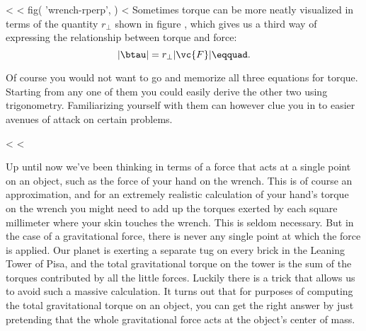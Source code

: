 <%
<%
  fig(
    'wrench-rperp',
  )
<%
Sometimes torque can be more neatly visualized in terms of
the quantity $r_{\perp}$ shown in figure , which
gives us a third way of expressing the relationship
between torque and force:
\begin{equation*}
                |\btau |    =    r_{\perp} |\vc{F}|\eqquad.
\end{equation*}

Of course you would not want to go and memorize all three
equations for torque. Starting from any one of them you
could easily derive the other two using trigonometry.
Familiarizing yourself with them can however clue you in to
easier avenues of attack on certain problems.

<%
<%

Up until now we've been thinking in terms of a force that
acts at a single point on an object, such as the force of
your hand on the wrench. This is of course an approximation,
and for an extremely realistic calculation of your hand's
torque on the wrench you might need to add up the torques
exerted by each square millimeter where your skin touches
the wrench. This is seldom necessary. But in the case of a
gravitational force, there is never any single point at
which the force is applied. Our planet is exerting a
separate tug on every brick in the Leaning Tower of Pisa,
and the total gravitational torque on the tower is the sum
of the torques contributed by all the little forces. Luckily
there is a trick that allows us to avoid such a massive
calculation. It turns out that for purposes of computing the
total gravitational torque on an object, you can get the
right answer by just pretending that the whole gravitational
force acts at the object's center of mass.

